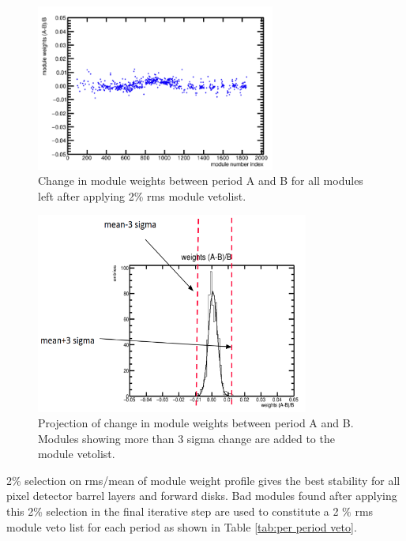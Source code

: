\begin{figure}[!htp]
\centering
\includegraphics[width=0.7\textwidth]{ashish_thesis/mod_weight_comparison.png}
\caption{%
   Change in module weights between period A and B for all modules left after applying 2\% rms module vetolist.
}
\label{fig:mod_w_com}
\end{figure}



\begin{figure}[!htp]
\centering
\includegraphics[width=0.8\textwidth]{ashish_thesis/mod_weight_comp_1.png}
\caption{%
   Projection of change in module weights between period A and B. Modules showing more than 3 sigma change are added to the module vetolist.
}
\label{fig:mod_w_com_1}
\end{figure}
   
 2\% selection on rms/mean of module weight profile gives the best stability for all pixel detector barrel layers and forward disks. Bad modules found after applying this 2\% selection in the final iterative step are used to constitute a 2 $\%$ rms module veto list for each period as shown in Table \ref{tab:per period veto}. 
                                                                                 
